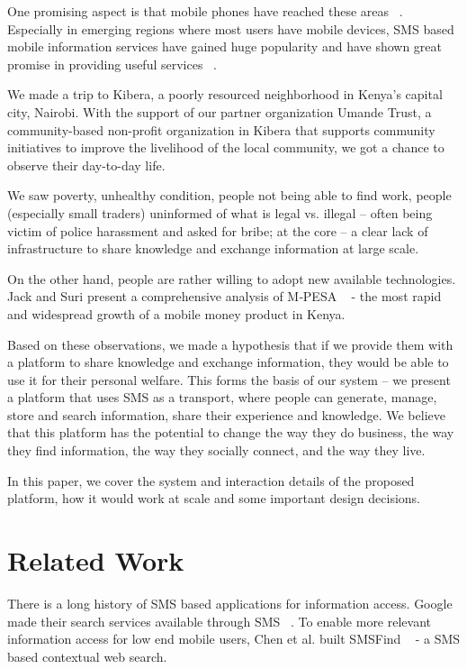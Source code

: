 \documentclass{chi-ext}
\begin{document}
One promising aspect is that mobile phones have reached these areas ~\cite{RePEc:cgd:wpaper:211}. Especially in emerging regions where most users have mobile devices, SMS based mobile information services have gained huge popularity and have shown great promise in providing useful services ~\cite{RePEc:cgd:wpaper:211}.

We made a trip to Kibera, a poorly resourced neighborhood in Kenya's capital city, Nairobi. With the support of our partner organization Umande Trust, a community-based non-profit organization in Kibera that supports community initiatives to improve the livelihood of the local community, we got a chance to observe their day-to-day life.

We saw poverty, unhealthy condition, people not being able to find work, people (especially small traders) uninformed of what is legal  vs. illegal -- often being victim of police harassment and asked for bribe; at the core -- a clear lack of infrastructure to share knowledge and exchange information at large scale.

On the other hand, people are rather willing to adopt new available technologies. Jack and Suri present a comprehensive analysis of M‐PESA ~\cite{NBERw16721} - the most rapid and widespread growth of a mobile money product in Kenya.

Based on these observations, we made a hypothesis that if we provide them with a platform to share knowledge and exchange information, they would be able to use it for their personal welfare. This forms the basis of our system -- we present a platform that uses SMS as a transport, where people can generate, manage, store and search information, share their experience and knowledge. We believe that this platform has the potential to change the way they do business, the way they find information, the way they socially connect, and the way they live.

In this paper, we cover the system and interaction details of the proposed platform, how it would work at scale and some important design decisions.

\section{Related Work}
There is a long history of SMS based applications for information access. Google made their search services available through SMS ~\cite{Schusteritsch:2005:MST:1056808.1057020}. To enable more relevant information access for low end mobile users, Chen et al. built SMSFind ~\cite{Chen:2009:SCW:1592606.1592611} - a SMS based contextual web search. 
\end{document}
